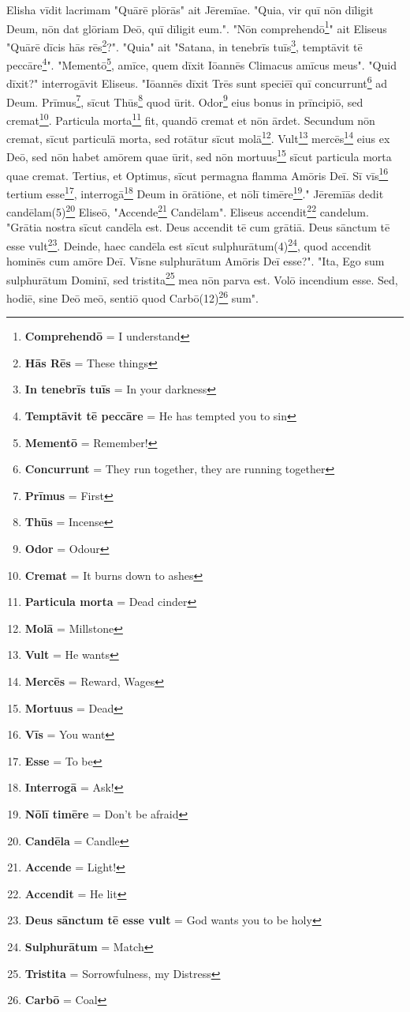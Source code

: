Elisha vīdit lacrimam "Quārē plōrās" ait Jēremīae. "Quia, vir quī nōn dīligit Deum, nōn dat glōriam Deō, quī dīligit eum.". "Nōn comprehendō\footnote{\textbf{Comprehendō} = I understand}" ait Eliseus "Quārē dīcis hās rēs\footnote{\textbf{Hās Rēs} = These things}?". "Quia" ait "Satana, in tenebrīs tuīs\footnote{\textbf{In tenebrīs tuīs} = In your darkness}, temptāvit tē peccāre\footnote{\textbf{Temptāvit tē peccāre} = He has tempted you to sin}". "Mementō\footnote{\textbf{Mementō} = Remember!}, amīce, quem dīxit Iōannēs Climacus amīcus meus". "Quid dīxit?" interrogāvit Eliseus. "Iōannēs dīxit \: Trēs sunt speciēī quī concurrunt\footnote{\textbf{Concurrunt} = They run together, they are running together} ad Deum. Prīmus\footnote{\textbf{Prīmus} = First}, sīcut Thūs\footnote{\textbf{Thūs} = Incense} quod ūrit. Odor\footnote{\textbf{Odor} = Odour} eius bonus in prīncipiō, sed cremat\footnote{\textbf{Cremat} = It burns down to ashes}. Particula morta\footnote{\textbf{Particula morta} = Dead cinder} fit, quandō cremat et nōn ārdet. Secundum nōn cremat, sīcut particulā morta, sed rotātur sīcut molā\footnote{\textbf{Molā} = Millstone}. Vult\footnote{\textbf{Vult} = He wants} mercēs\footnote{\textbf{Mercēs} = Reward, Wages} eius ex Deō, sed nōn habet amōrem quae ūrit, sed nōn mortuus\footnote{\textbf{Mortuus} = Dead} sīcut particula morta quae cremat. Tertius, et Optimus, sīcut permagna flamma Amōris Deī. Sī vīs\footnote{\textbf{Vīs} = You want} tertium esse\footnote{\textbf{Esse} = To be}, interrogā\footnote{\textbf{Interrogā} = Ask!} Deum in ōrātiōne, et nōlī timēre\footnote{\textbf{Nōlī timēre} = Don't be afraid}." Jēremīās dedit candēlam(5)\footnote{\textbf{Candēla} = Candle} Eliseō, "Accende\footnote{\textbf{Accende} = Light!} Candēlam". Eliseus accendit\footnote{\textbf{Accendit} = He lit} candelum. "Grātia nostra sīcut candēla est. Deus accendit tē cum grātiā. Deus sānctum tē esse vult\footnote{\textbf{Deus sānctum tē esse vult} = God wants you to be holy}. Deinde, haec candēla est sīcut sulphurātum(4)\footnote{\textbf{Sulphurātum} = Match}, quod accendit hominēs cum amōre Deī. Vīsne sulphurātum Amōris Deī esse?". "Ita, Ego sum sulphurātum Dominī, sed tristita\footnote{\textbf{Tristita} = Sorrowfulness, my Distress} mea nōn parva est. Volō incendium esse. Sed, hodiē, sine Deō meō, sentiō quod Carbō(12)\footnote{\textbf{Carbō} = Coal} sum".\par
